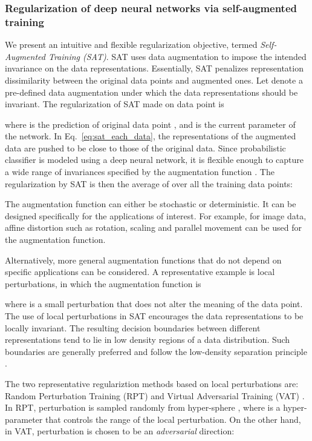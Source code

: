 \documentclass{article}
\theoremstyle{plain}
\begin{document}
\subsubsection{Regularization of deep neural networks via self-augmented training} \label{subsec:regl}
We present an intuitive and flexible regularization objective, termed \emph{Self-Augmented Training (SAT)}. 
SAT uses data augmentation to impose the intended invariance on the data representations. Essentially, SAT penalizes representation dissimilarity between the original data points and augmented ones. 
Let  denote a pre-defined data augmentation under which the data representations should be invariant. The regularization of SAT made on data point  is

where  is the prediction of original data point , and  is the current parameter of the network. 
In Eq.~\eqref{eq:sat_each_data}, the representations of the augmented data are pushed to be close to those of the original data. Since probabilistic classifier  is modeled using a deep neural network, it is flexible enough to capture a wide range of invariances specified by the augmentation function . The regularization by SAT is then the average of  over all the training data points:


The augmentation function  can either be stochastic or deterministic. It can be designed specifically for the applications of interest. For example, for image data, affine distortion such as rotation, scaling and parallel movement can be used for the augmentation function.


Alternatively, more general augmentation functions that do not depend on specific applications can be considered. A representative example is local perturbations, in which the augmentation function is

where  is a small perturbation that does not alter the meaning of the data point. The use of local perturbations in SAT encourages the data representations to be locally invariant. The resulting decision boundaries between different representations tend to lie in low density regions of a data distribution. Such boundaries are generally preferred and follow the low-density separation principle \citep{grandvalet2004semi}.

The two representative regulariztion methods based on local perturbations are: Random Perturbation Training (RPT) \citep{bachman2014learning} and Virtual Adversarial Training (VAT) \citep{miyato2015distributional}.
In RPT, perturbation  is sampled randomly from hyper-sphere , where  is a hyper-parameter that controls the range of the local perturbation.
On the other hand, in VAT, perturbation  is chosen to be an \emph{adversarial} direction:
\end{document}
